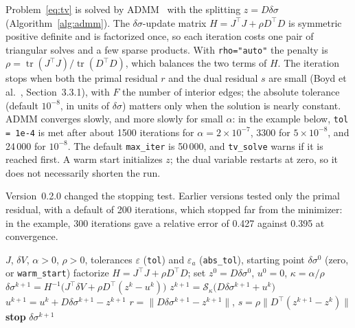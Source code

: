 \documentclass[11pt,a4paper]{article}
\newcommand{\code}[1]{\texttt{#1}}
\newcommand{\dsig}{\delta\sigma}
\newcommand{\dV}{\delta V}
\begin{document}
Problem~\eqref{eq:tv} is solved by ADMM~\cite{Boyd2011} with the splitting
$z = D\dsig$ (Algorithm~\ref{alg:admm}). The $\dsig$-update matrix
$H = J^\top J+\rho D^\top D$ is symmetric positive definite and is factorized
once, so each iteration costs one pair of triangular solves and a few sparse
products. With \code{rho="auto"} the penalty is
$\rho = \operatorname{tr}(J^\top J)/\operatorname{tr}(D^\top D)$, which
balances the two terms of $H$. The iteration stops when both the primal
residual $r$ and the dual residual $s$ are small (Boyd et al.~\cite{Boyd2011},
Section~3.3.1), with $F$ the number of interior edges; the absolute
tolerance (default $10^{-8}$, in units of $\dsig$) matters only when the
solution is nearly constant. ADMM converges slowly, and more slowly for small
$\alpha$: in the example below, \code{tol = 1e-4} is met after about 1500
iterations for $\alpha=2\times10^{-7}$, 3300 for $5\times10^{-8}$, and 24\,000
for $10^{-8}$. The default \code{max\_iter} is 50\,000, and \code{tv\_solve}
warns if it is reached first. A warm start initializes $z$; the dual variable
restarts at zero, so it does not necessarily shorten the run.

Version~0.2.0 changed the stopping test. Earlier versions tested only the
primal residual, with a default of 200 iterations, which stopped far from the
minimizer: in the example, 300 iterations gave a relative error of 0.427
against 0.395 at convergence.

\begin{algorithm}[ht]
\caption{ADMM for TV-regularized difference EIT (\code{tv\_solve})}
\label{alg:admm}
\begin{algorithmic}[1]
\Require $J$, $\dV$, $\alpha>0$, $\rho>0$, tolerances $\varepsilon$
(\code{tol}) and $\varepsilon_a$ (\code{abs\_tol}), starting point
$\dsig^0$ (zero, or \code{warm\_start})
\State factorize $H = J^\top J + \rho D^\top D$; set $z^0=D\dsig^0$,
$u^0=0$, $\kappa = \alpha/\rho$
\For{$k = 0,1,\dots,\code{max\_iter}-1$}
  \State $\dsig^{k+1} = H^{-1}\bigl(J^\top\dV + \rho D^\top(z^k-u^k)\bigr)$
  \State $z^{k+1} = \mathcal S_\kappa\bigl(D\dsig^{k+1}+u^k\bigr)$
  \State $u^{k+1} = u^k + D\dsig^{k+1} - z^{k+1}$
  \State $r = \|D\dsig^{k+1}-z^{k+1}\|$,\quad
    $s = \rho\|D^\top(z^{k+1}-z^k)\|$
  \If{$r \le \sqrt F\varepsilon_a + \varepsilon\max(\|D\dsig^{k+1}\|,
    \|z^{k+1}\|)$ \textbf{and} $s \le \rho\bigl(\sqrt E\varepsilon_a +
    \varepsilon\|D^\top u^{k+1}\|\bigr)$} \textbf{stop} \EndIf
\EndFor
\State \Return $\dsig^{k+1}$
\end{algorithmic}
\end{algorithm}
\end{document}

